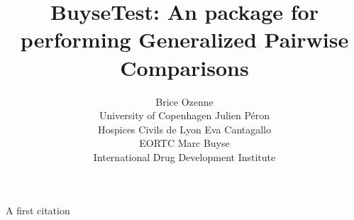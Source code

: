 \documentclass[12pt]{jss}
\author{Brice Ozenne \\University of Copenhagen
\And Julien P\'{e}ron \\Hospices Civils de Lyon
\AND Eva Cantagallo \\EORTC
\And Marc Buyse \\International Drug Development Institute}
\date{}
\title{BuyseTest: An \proglang{R} package for performing Generalized Pairwise Comparisons}
\begin{document}
\maketitle
A first citation \cite{buyse2010generalized}


\clearpage


\end{document}
